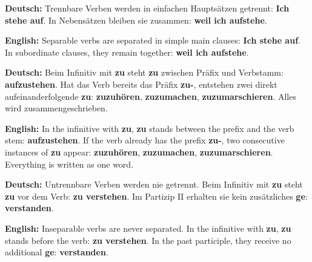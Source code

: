 \documentclass[a4paper,11pt]{article}
\newcommand{\GermanText}[1]{\textbf{Deutsch: }#1\par}
\newcommand{\EnglishText}[1]{{\small\color{SoftGray}\textbf{English: }#1\par}}
\begin{document}
        \begin{warningbox}
            \GermanText{Trennbare Verben werden in einfachen Hauptsätzen getrennt: \textbf{Ich stehe auf}. In Nebensätzen bleiben sie zusammen: \textbf{weil ich aufstehe}.}
            \EnglishText{Separable verbs are separated in simple main clauses: \textbf{Ich stehe auf}. In subordinate clauses, they remain together: \textbf{weil ich aufstehe}.}

            \GermanText{Beim Infinitiv mit \textbf{zu} steht \textbf{zu} zwischen Präfix und Verbstamm: \textbf{aufzustehen}. Hat das Verb bereits das Präfix \textbf{zu-}, entstehen zwei direkt aufeinanderfolgende \textbf{zu}: \textbf{zuzuhören}, \textbf{zuzumachen}, \textbf{zuzumarschieren}. Alles wird zusammengeschrieben.}
            \EnglishText{In the infinitive with \textbf{zu}, \textbf{zu} stands between the prefix and the verb stem: \textbf{aufzustehen}. If the verb already has the prefix \textbf{zu-}, two consecutive instances of \textbf{zu} appear: \textbf{zuzuhören}, \textbf{zuzumachen}, \textbf{zuzumarschieren}. Everything is written as one word.}

            \GermanText{Untrennbare Verben werden nie getrennt. Beim Infinitiv mit \textbf{zu} steht \textbf{zu} vor dem Verb: \textbf{zu verstehen}. Im Partizip II erhalten sie kein zusätzliches \textbf{ge}: \textbf{verstanden}.}
            \EnglishText{Inseparable verbs are never separated. In the infinitive with \textbf{zu}, \textbf{zu} stands before the verb: \textbf{zu verstehen}. In the past participle, they receive no additional \textbf{ge}: \textbf{verstanden}.}
        \end{warningbox}
\end{document}
